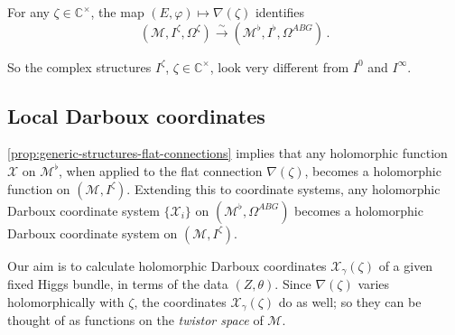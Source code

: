 \documentclass[12pt,letterpaper,reqno]{article}
\numberwithin{equation}{section}
\newcommand{\cM}{\ensuremath{\mathcal M}}
\newcommand{\cX}{\ensuremath{\mathcal X}}
\newcommand{\bbC}{\ensuremath{\mathbb C}}
\newcommand{\simarrow}{\xrightarrow\sim}
\newcommand{\ti}[1]{\textit{#1}}
\begin{document}
\begin{prop} \label{prop:generic-structures-flat-connections} For any $\zeta \in \bbC^\times$,
the map $(E,\varphi) \mapsto \nabla(\zeta)$ identifies
\begin{equation}
  (\cM, I^\zeta, \Omega^\zeta) \simarrow (\cM^\flat, I^\flat, \Omega^{ABG}) \, .
\end{equation}
\end{prop}

So the complex structures $I^\zeta$, $\zeta \in \bbC^\times$, look very different
from $I^0$ and $I^\infty$.


\subsection{Local Darboux coordinates}

\autoref{prop:generic-structures-flat-connections} 
implies that any holomorphic function $\cX$ on $\cM^\flat$,
when applied to
the flat connection $\nabla(\zeta)$, becomes a holomorphic
function on $(\cM, I^\zeta)$.
Extending this to coordinate systems, any holomorphic 
Darboux coordinate system $\{\cX_i\}$ on $(\cM^\flat, \Omega^{ABG})$
becomes a holomorphic Darboux coordinate system on
$(\cM, I^\zeta)$.

Our aim is to calculate holomorphic Darboux
coordinates $\cX_\gamma(\zeta)$ of a given fixed Higgs bundle,
in terms of the data $(Z, \theta)$.
Since $\nabla(\zeta)$ varies
holomorphically with $\zeta$, the coordinates
$\cX_\gamma(\zeta)$ do as well; so they can be thought of
as functions on the \ti{twistor space} of $\cM$.
\end{document}
